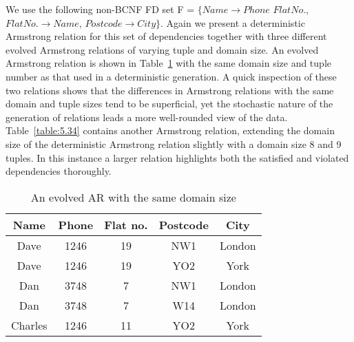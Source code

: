 \begin{example}
\begin{rm}
We use the following non-BCNF FD set F =
$\{ Name \to Phone$ $Flat No.$, $Flat No. \to Name$, $Postcode \to City \}$.
Again we present a deterministic Armstrong relation for this set of 
dependencies together with three different evolved Armstrong relations
of varying tuple and domain size. An evolved
Armstrong relation is shown in Table~\ref{table:5.32} with the same
domain size and tuple number as that used in a deterministic
generation. A quick 
inspection of these two relations shows that the differences in 
Armstrong relations with the same domain and tuple sizes tend to be
superficial, yet the stochastic nature of the generation of relations leads
 a more well-rounded view of the data. Table~\ref{table:5.34} contains another Armstrong relation, 
extending the domain size of the deterministic Armstrong relation
slightly with a domain size 8 and 9 tuples. In
this instance a larger relation highlights both the satisfied
and violated dependencies thoroughly. 
\end{rm}
\end{example}

{\line
\begin{table}
\begin{center}
\begin{tabular}{|c|c|c|c|c|} \hline 
{ \bf Name} & { \bf Phone} & {\bf Flat no. }  & { \bf Postcode}  & {\bf City} \\ \hline
Dave & 1246 & 19 & NW1 & London  \\
Dave & 1246 & 19 & YO2 & York \\
Dan & 3748 & 7 & NW1 & London \\
Dan & 3748 & 7 & W14 & London \\
Charles & 1246 & 11 & YO2 & York \\ \hline
\end{tabular}
\end{center}
\caption{\label{table:5.32} An evolved AR with the same domain size }
\end{table}
}

